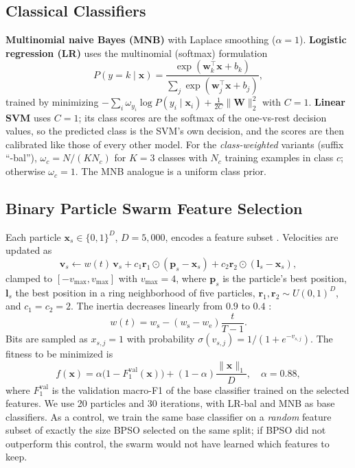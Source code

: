 \documentclass[lettersize,journal]{IEEEtran}
\begin{document}
\subsection{Classical Classifiers}
\textbf{Multinomial naive Bayes (MNB)} with Laplace smoothing ($\alpha=1$). \textbf{Logistic regression (LR)} uses the multinomial (softmax) formulation
\begin{equation}
P(y=k\mid\mathbf{x}) = \frac{\exp(\mathbf{w}_k^{\top}\mathbf{x}+b_k)}{\sum_{j}\exp(\mathbf{w}_j^{\top}\mathbf{x}+b_j)},
\end{equation}
trained by minimizing $-\sum_i \omega_{y_i}\log P(y_i\mid\mathbf{x}_i) + \frac{1}{2C}\lVert\mathbf{W}\rVert_2^2$ with $C=1$. \textbf{Linear SVM} uses $C=1$; its class scores are the softmax of the one-vs-rest decision values, so the predicted class is the SVM's own decision, and the scores are then calibrated like those of every other model. For the \textit{class-weighted} variants (suffix ``-bal''), $\omega_c = N/(K N_c)$ for $K=3$ classes with $N_c$ training examples in class $c$; otherwise $\omega_c=1$. The MNB analogue is a uniform class prior.

\subsection{Binary Particle Swarm Feature Selection}
Each particle $\mathbf{x}_s \in \{0,1\}^{D}$, $D=5{,}000$, encodes a feature subset \cite{kennedy1997discrete}. Velocities are updated as
\begin{equation}
\mathbf{v}_s \leftarrow w(t)\,\mathbf{v}_s + c_1\mathbf{r}_1\odot(\mathbf{p}_s-\mathbf{x}_s) + c_2\mathbf{r}_2\odot(\mathbf{l}_s-\mathbf{x}_s),
\end{equation}
clamped to $[-v_{\max},v_{\max}]$ with $v_{\max}=4$, where $\mathbf{p}_s$ is the particle's best position, $\mathbf{l}_s$ the best position in a ring neighborhood of five particles, $\mathbf{r}_1,\mathbf{r}_2 \sim U(0,1)^D$, and $c_1=c_2=2$. The inertia decreases linearly from $0.9$ to $0.4$ \cite{shi1998modified}:
\begin{equation}
w(t) = w_{\mathrm{s}} - (w_{\mathrm{s}}-w_{\mathrm{e}})\frac{t}{T-1}.
\end{equation}
Bits are sampled as $x_{s,j}=1$ with probability $\sigma(v_{s,j})=1/(1+e^{-v_{s,j}})$. The fitness to be minimized is
\begin{equation}
f(\mathbf{x}) = \alpha\bigl(1-F_1^{\mathrm{val}}(\mathbf{x})\bigr) + (1-\alpha)\frac{\lVert\mathbf{x}\rVert_1}{D},\quad \alpha=0.88,
\end{equation}
where $F_1^{\mathrm{val}}$ is the validation macro-F1 of the base classifier trained on the selected features. We use 20 particles and 30 iterations, with LR-bal and MNB as base classifiers. As a control, we train the same base classifier on a \textit{random} feature subset of exactly the size BPSO selected on the same split; if BPSO did not outperform this control, the swarm would not have learned which features to keep.
\end{document}
